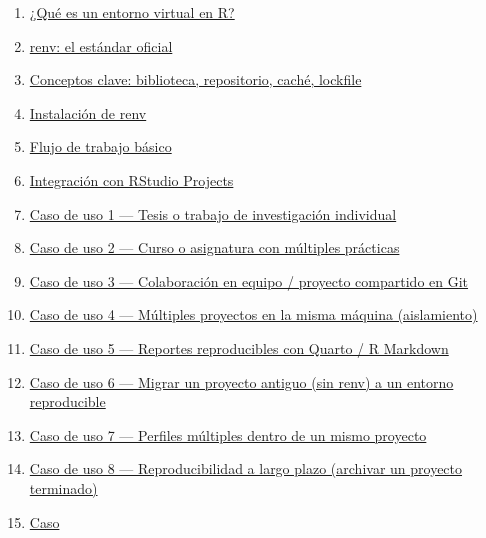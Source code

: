 \documentclass[
  man,
  floatsintext,
  longtable,
  a4paper,
  nolmodern,
  notxfonts,
  notimes,
  12pt,
  colorlinks=true,linkcolor=blue,citecolor=blue,urlcolor=blue]{apa7}
\providecommand{\tightlist}{%
  \setlength{\itemsep}{0pt}\setlength{\parskip}{0pt}}
\begin{document}
\begin{enumerate}
\def\labelenumi{\arabic{enumi}.}
\tightlist
\item
  \hyperref[1-quuxe9-es-un-entorno-virtual-en-r]{¿Qué es un entorno
  virtual en R?}
\item
  \hyperref[2-renv-el-estuxe1ndar-oficial]{renv: el estándar oficial}
\item
  \hyperref[3-conceptos-clave-biblioteca-repositorio-cachuxe9-lockfile]{Conceptos
  clave: biblioteca, repositorio, caché, lockfile}
\item
  \hyperref[4-instalaciuxf3n-de-renv]{Instalación de renv}
\item
  \hyperref[5-flujo-de-trabajo-buxe1sico]{Flujo de trabajo básico}
\item
  \hyperref[6-integraciuxf3n-con-rstudio-projects]{Integración con
  RStudio Projects}
\item
  \hyperref[7-caso-de-uso-1--tesis-o-trabajo-de-investigaciuxf3n-individual]{Caso
  de uso 1 --- Tesis o trabajo de investigación individual}
\item
  \hyperref[8-caso-de-uso-2--curso-o-asignatura-con-muxfaltiples-pruxe1cticas]{Caso
  de uso 2 --- Curso o asignatura con múltiples prácticas}
\item
  \hyperref[9-caso-de-uso-3--colaboraciuxf3n-en-equipo--proyecto-compartido-en-git]{Caso
  de uso 3 --- Colaboración en equipo / proyecto compartido en Git}
\item
  \hyperref[10-caso-de-uso-4--muxfaltiples-proyectos-en-la-misma-muxe1quina-aislamiento]{Caso
  de uso 4 --- Múltiples proyectos en la misma máquina (aislamiento)}
\item
  \hyperref[11-caso-de-uso-5--reportes-reproducibles-con-quarto--r-markdown]{Caso
  de uso 5 --- Reportes reproducibles con Quarto / R Markdown}
\item
  \hyperref[12-caso-de-uso-6--migrar-un-proyecto-antiguo-sin-renv-a-un-entorno-reproducible]{Caso
  de uso 6 --- Migrar un proyecto antiguo (sin renv) a un entorno
  reproducible}
\item
  \hyperref[13-caso-de-uso-7--perfiles-muxfaltiples-dentro-de-un-mismo-proyecto]{Caso
  de uso 7 --- Perfiles múltiples dentro de un mismo proyecto}
\item
  \hyperref[14-caso-de-uso-8--reproducibilidad-a-largo-plazo-archivar-un-proyecto-terminado]{Caso
  de uso 8 --- Reproducibilidad a largo plazo (archivar un proyecto
  terminado)}
\item
  \hyperref[15-caso-de-uso-9--despliegue-en-servidor--docker--posit-connect]{Caso
}
\end{enumerate}
\end{document}

